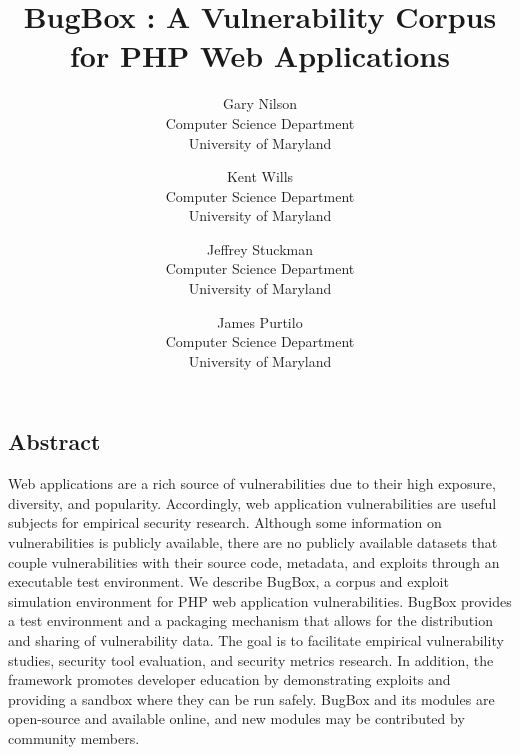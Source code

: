 \documentclass[letterpaper,twocolumn,10pt]{article}
\begin{document}
\date{}


\title{\Large \bf BugBox : A Vulnerability Corpus for PHP Web Applications}


\author{
{\rm Gary Nilson}\\
Computer Science Department\\
University of Maryland
\and
{\rm Kent Wills}\\
Computer Science Department\\
University of Maryland
\and
{\rm Jeffrey Stuckman}\\
Computer Science Department\\
University of Maryland
\and
{\rm James Purtilo}\\
Computer Science Department\\
University of Maryland
} %

\maketitle



 
 

\subsection*{Abstract}

Web applications are a rich source of vulnerabilities due to their high exposure, diversity, and popularity. Accordingly, web application vulnerabilities are useful subjects for empirical security research. Although some information on vulnerabilities is publicly available, there are no publicly available datasets that couple vulnerabilities with their source code, metadata, and exploits through an executable test environment. We describe BugBox, a corpus and exploit simulation environment for PHP web application vulnerabilities. BugBox provides a test environment and a packaging mechanism that allows for the distribution and sharing of vulnerability data. The goal is to facilitate empirical vulnerability studies, security tool evaluation, and security metrics research. In addition, the framework promotes developer education by demonstrating exploits and providing a sandbox where they can be run safely. BugBox and its modules are open-source and available online, and new modules may be contributed by community members.
\end{document}
